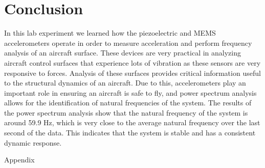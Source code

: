 \documentclass{article}
\begin{document}
\section{Conclusion}
In this lab experiment we learned how the piezoelectric and MEMS accelerometers operate in order to measure acceleration and perform frequency analysis of an aircraft surface. These devices are very practical in analyzing aircraft control surfaces that experience lots of vibration as these sensors are very responsive to forces. Analysis of these surfaces provides critical information useful to the structural dynamics of an aircraft. Due to this, accelerometers play an important role in ensuring an aircraft is safe to fly, and power spectrum analysis allows for the identification of natural frequencies of the system. The results of the power spectrum analysis show that the natural frequency of the system is around 59.9 Hz, which is very close to the average natural frequency over the last second of the data. This indicates that the system is stable and has a consistent dynamic response.

\newpage
\thispagestyle{empty}  %
\begin{center}
	\vspace*{\fill}
	{\Huge Appendix}
	\vspace*{\fill}
\end{center}
\end{document}

